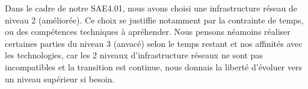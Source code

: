 \documentclass[../Livrable1.tex]{subfiles}
\begin{document}
Dans le cadre de notre SAE4.01, nous avons choisi une infrastructure réseau de niveau 2 (améliorée).
Ce choix se justiffie notamment par la contrainte de temps, ou des compétences techniques à apréhender.
Nous pensons néamoins réaliser certaines parties du niveau 3 (anvacé) selon le temps restant et nos affinités avec les technologies, 
car les 2 niveaux d'infrastructure réseaux ne sont pas incompatibles et la transition est continue, nous donnais la liberté d'évoluer vers un niveau supérieur si besoin.
\end{document}
